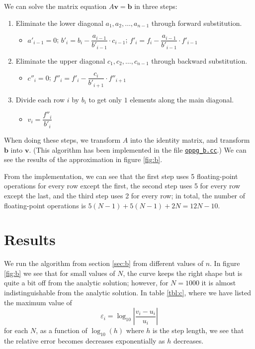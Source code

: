 \documentclass[12pt,a4paper]{article}
\newcommand\V[1]{\mathbf{#1}}                  %
\begin{document}
We can solve the matrix equation $A \V{v} = \V{b}$ in three steps:
\begin{enumerate}
  \item Eliminate the lower diagonal $a_1,a_2,\ldots,a_{n-1}$ through forward substitution.
    \begin{itemize}
      \item $a'_{i-1} = 0$; $b'_i = b_i - \dfrac{a_{i-1}}{b'_{i-1}} \cdot c_{i-1}$; $ f'_i = f_i - \dfrac{a_{i-1}}{b'_{i-1}} \cdot f'_{i-1}$
    \end{itemize}
  \item Eliminate the upper diagonal $c_1,c_2,\ldots,c_{n-1}$ through backward substitution.
    \begin{itemize}
      \item $c''_{i} = 0$; $f''_{i} = f'_{i} - \dfrac{c_i}{b'_{i+1}} \cdot f''_{i+1}$
    \end{itemize}
  \item Divide each row $i$ by $b_i$ to get only $1$ elements along the main diagonal.
    \begin{itemize}
      \item $v_i = \dfrac{f''_i}{b'_i}$
    \end{itemize}
\end{enumerate}
When doing these steps, we transform $A$ into the identity matrix, and transform $\V{b}$ into $\V{v}$. (This algorithm has been implemented in the file \href{https://github.com/frxstrem/fys3150/tree/master/project1/oppg_b.cc}{\tt oppg\_b.cc}.) We can see the results of the approximation in figure \ref{fig:b}.

From the implementation, we can see that the first step uses 5 floating-point operations for every row except the first, the second step uses 5 for every row except the last, and the third step uses 2 for every row; in total, the number of floating-point operations is $5 (N - 1) + 5 (N - 1) + 2 N = 12N - 10$.

\section{Results}

We run the algorithm from section \ref{sec:b} from different values of $n$. In figure \ref{fig:b} we see that for small values of $N$, the curve keeps the right shape but is quite a bit off from the analytic solution; however, for $N = 1000$ it is almost indistinguishable from the analytic solution. In table \ref{tbl:c}, where we have listed the maximum value of
\begin{equation}
  \varepsilon_i = \log_{10}\left| \frac{v_i - u_i}{u_i} \right|
\end{equation}
for each $N$, as a function of $\log_{10}(h)$ where $h$ is the step length, we see that the relative error becomes decreases exponentially as $h$ decreases.
\end{document}
